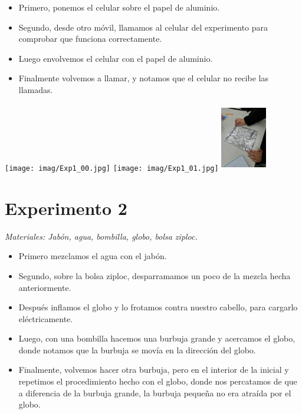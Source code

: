 \documentclass[]{article}
\newenvironment{Figura}
  {\par\medskip\noindent\minipage{\linewidth}}
  {\endminipage\par\medskip}
\begin{document}
\begin{multicols*}{2}
\vspace{-\topsep}
\begin{itemize}
    \setlength{\parskip}{0pt} 
    \setlength{\itemsep}{0pt plus 1pt}
    \item Primero, ponemos el celular sobre el papel de aluminio.
    \item Segundo, desde otro móvil, llamamos al celular del experimento para comprobar que funciona correctamente.
    \item Luego envolvemos el celular con el papel de aluminio.
    \item Finalmente volvemos a llamar, y notamos que el celular no recibe las llamadas.
\end{itemize}
\vspace{-\topsep}


\begin{Figura}
    \centering
    \texttt{[image: imag/Exp1\_00.jpg]}
    \texttt{[image: imag/Exp1\_01.jpg]}
    \includegraphics[width=2cm, height=3cm]{imag/Exp1_02.jpg}
\end{Figura}





\section*{Experimento 2}
\textit{Materiales: Jabón, agua, bombilla, globo, bolsa ziploc.}

\vspace{-\topsep}
\begin{itemize}
    \setlength{\parskip}{0pt} 
    \setlength{\itemsep}{0pt plus 1pt}
    \item Primero mezclamos el agua con el jabón.
    \item Segundo, sobre la bolsa ziploc, desparramamos un poco de la mezcla hecha anteriormente.
    \item Después inflamos el globo y lo frotamos contra nuestro cabello, para cargarlo eléctricamente.
    \item Luego, con una bombilla hacemos una burbuja grande y acercamos el globo, donde notamos que la burbuja se movía en la dirección del globo.
    \item Finalmente, volvemos hacer otra burbuja, pero en el interior de la inicial y repetimos el procedimiento hecho con el globo, donde nos percatamos de que a diferencia
    de la burbuja grande, la burbuja pequeña no era atraída por el globo.
\end{itemize}
\vspace{-\topsep}




\end{multicols*}
\end{document}
